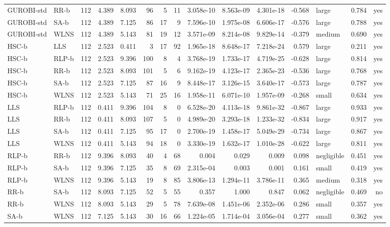 \begin{table}[htbp]
\begin{tabular}{llrrrrrrrrrrlrr}
GUROBI-std & RR-b & 112 & 4.389 & 8.093 & 96 & 5 & 11 & 3.058e-10 & 8.563e-09 & 4.301e-18 & -0.568 & large & 0.784 & yes \\
GUROBI-std & SA-b & 112 & 4.389 & 7.125 & 86 & 17 & 9 & 7.596e-10 & 1.975e-08 & 6.606e-17 & -0.576 & large & 0.788 & yes \\
GUROBI-std & WLNS & 112 & 4.389 & 5.143 & 81 & 19 & 12 & 3.571e-09 & 8.214e-08 & 9.829e-14 & -0.379 & medium & 0.690 & yes \\
HSC-b & LLS & 112 & 2.523 & 0.411 & 3 & 17 & 92 & 1.965e-18 & 8.648e-17 & 7.218e-24 & 0.579 & large & 0.211 & yes \\
HSC-b & RLP-b & 112 & 2.523 & 9.396 & 100 & 8 & 4 & 3.768e-19 & 1.733e-17 & 4.719e-25 & -0.628 & large & 0.814 & yes \\
HSC-b & RR-b & 112 & 2.523 & 8.093 & 101 & 5 & 6 & 9.162e-19 & 4.123e-17 & 2.365e-23 & -0.536 & large & 0.768 & yes \\
HSC-b & SA-b & 112 & 2.523 & 7.125 & 87 & 16 & 9 & 8.448e-17 & 3.126e-15 & 3.640e-17 & -0.573 & large & 0.787 & yes \\
HSC-b & WLNS & 112 & 2.523 & 5.143 & 71 & 25 & 16 & 1.958e-11 & 6.071e-10 & 1.957e-09 & -0.268 & small & 0.634 & yes \\
LLS & RLP-b & 112 & 0.411 & 9.396 & 104 & 8 & 0 & 6.528e-20 & 4.113e-18 & 9.861e-32 & -0.867 & large & 0.933 & yes \\
LLS & RR-b & 112 & 0.411 & 8.093 & 107 & 5 & 0 & 4.989e-20 & 3.293e-18 & 1.233e-32 & -0.834 & large & 0.917 & yes \\
LLS & SA-b & 112 & 0.411 & 7.125 & 95 & 17 & 0 & 2.700e-19 & 1.458e-17 & 5.049e-29 & -0.734 & large & 0.867 & yes \\
LLS & WLNS & 112 & 0.411 & 5.143 & 94 & 18 & 0 & 3.330e-19 & 1.632e-17 & 1.010e-28 & -0.622 & large & 0.811 & yes \\
RLP-b & RR-b & 112 & 9.396 & 8.093 & 40 & 4 & 68 & 0.004 & 0.029 & 0.009 & 0.098 & negligible & 0.451 & yes \\
RLP-b & SA-b & 112 & 9.396 & 7.125 & 35 & 8 & 69 & 2.315e-04 & 0.003 & 0.001 & 0.161 & small & 0.419 & yes \\
RLP-b & WLNS & 112 & 9.396 & 5.143 & 19 & 8 & 85 & 3.806e-13 & 1.294e-11 & 3.786e-11 & 0.365 & medium & 0.318 & yes \\
RR-b & SA-b & 112 & 8.093 & 7.125 & 52 & 5 & 55 & 0.357 & 1.000 & 0.847 & 0.062 & negligible & 0.469 & no \\
RR-b & WLNS & 112 & 8.093 & 5.143 & 29 & 5 & 78 & 7.639e-08 & 1.451e-06 & 2.352e-06 & 0.286 & small & 0.357 & yes \\
SA-b & WLNS & 112 & 7.125 & 5.143 & 30 & 16 & 66 & 1.224e-05 & 1.714e-04 & 3.056e-04 & 0.277 & small & 0.362 & yes \\
\bottomrule
\end{tabular}
\end{table}
